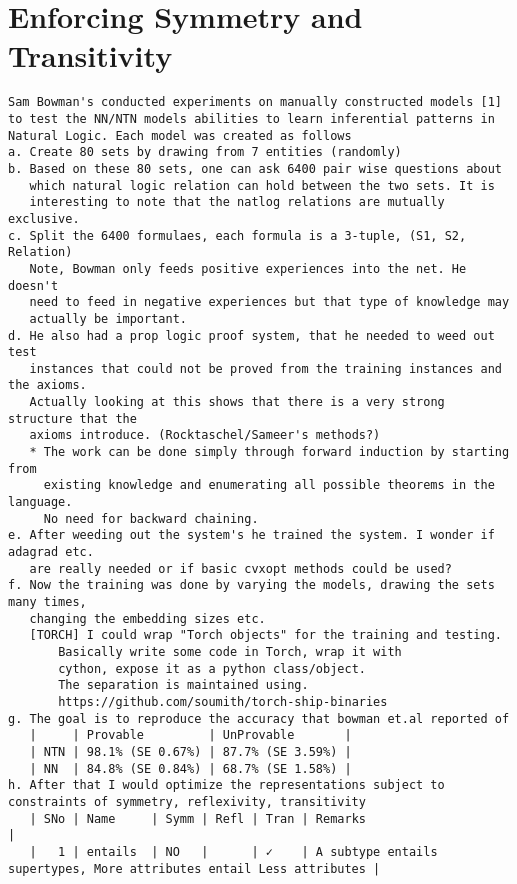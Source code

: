 \documentclass[12pt,answers]{exam} %
\newcommand{\remove}[0]{}
\newcommand{\remove}[1]{}
\begin{document}
\remove{
\section{Enforcing Symmetry and Transitivity}
\label{sec:enforc-symm-trans}
\begin{Verbatim}[fontsize=\small]
Sam Bowman's conducted experiments on manually constructed models [1]
to test the NN/NTN models abilities to learn inferential patterns in
Natural Logic. Each model was created as follows
a. Create 80 sets by drawing from 7 entities (randomly)
b. Based on these 80 sets, one can ask 6400 pair wise questions about
   which natural logic relation can hold between the two sets. It is
   interesting to note that the natlog relations are mutually exclusive.
c. Split the 6400 formulaes, each formula is a 3-tuple, (S1, S2, Relation)
   Note, Bowman only feeds positive experiences into the net. He doesn't
   need to feed in negative experiences but that type of knowledge may
   actually be important.
d. He also had a prop logic proof system, that he needed to weed out test
   instances that could not be proved from the training instances and the axioms.
   Actually looking at this shows that there is a very strong structure that the
   axioms introduce. (Rocktaschel/Sameer's methods?)
   * The work can be done simply through forward induction by starting from
     existing knowledge and enumerating all possible theorems in the language.
     No need for backward chaining.
e. After weeding out the system's he trained the system. I wonder if adagrad etc.
   are really needed or if basic cvxopt methods could be used?
f. Now the training was done by varying the models, drawing the sets many times,
   changing the embedding sizes etc.
   [TORCH] I could wrap "Torch objects" for the training and testing.
       Basically write some code in Torch, wrap it with
       cython, expose it as a python class/object.
       The separation is maintained using.
       https://github.com/soumith/torch-ship-binaries
g. The goal is to reproduce the accuracy that bowman et.al reported of
   |     | Provable         | UnProvable       |
   | NTN | 98.1% (SE 0.67%) | 87.7% (SE 3.59%) |
   | NN  | 84.8% (SE 0.84%) | 68.7% (SE 1.58%) |
h. After that I would optimize the representations subject to constraints of symmetry, reflexivity, transitivity
   | SNo | Name     | Symm | Refl | Tran | Remarks                                                              |
   |   1 | entails  | NO   |      | ✓    | A subtype entails supertypes, More attributes entail Less attributes |

\end{Verbatim}}
\end{document}
